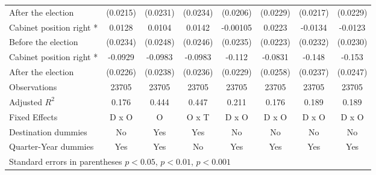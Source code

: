 \begin{table}[htbp]
\begin{tabular}{l*{7}{c}}
After the election                    &    (0.0215)         &    (0.0231)         &    (0.0234)         &    (0.0206)         &    (0.0229)         &    (0.0217)         &    (0.0229)         \\
[0,5em]
Cabinet position right * &      0.0128         &      0.0104         &      0.0142         &    -0.00105         &      0.0223         &     -0.0134         &     -0.0123         \\
Before the election                    &    (0.0234)         &    (0.0248)         &    (0.0246)         &    (0.0235)         &    (0.0223)         &    (0.0232)         &    (0.0230)         \\
[0,5em]
Cabinet position right * &     -0.0929\sym{***}&     -0.0983\sym{***}&     -0.0983\sym{***}&      -0.112\sym{***}&     -0.0831\sym{**} &      -0.148\sym{***}&      -0.153\sym{***}\\
After the election                    &    (0.0226)         &    (0.0238)         &    (0.0236)         &    (0.0229)         &    (0.0258)         &    (0.0237)         &    (0.0247)         \\
\hline
Observations        &       23705         &       23705         &       23705         &       23705         &       23705         &       23705         &       23705         \\
Adjusted \(R^{2}\)  &       0.176         &       0.444         &       0.447         &       0.211         &       0.176         &       0.189         &       0.189         \\
Fixed Effects       &       D x O         &           O         &       O x T         &       D x O         &       D x O         &       D x O         &       D x O         \\
Destination dummies &          No         &         Yes         &         Yes         &          No         &          No         &          No         &          No         \\
Quarter-Year dummies&         Yes         &         Yes         &          No         &         Yes         &         Yes         &         Yes         &         Yes         \\
\hline\hline
\multicolumn{8}{l}{ Standard errors in parentheses \sym{*} \(p<0.05\), \sym{**} \(p<0.01\), \sym{***} \(p<0.001\)}\\
\end{tabular}
\label{app_table_base-R6}
\end{table}
